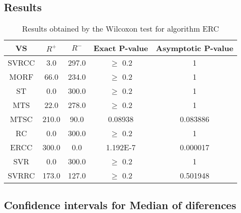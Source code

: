 \documentclass[a4paper,10pt]{article}
\begin{document}
\subsection{Results}

\begin{table}[!htp]
\centering\small
\begin{tabular}{
|c|c|c|c|c|}
\hline
 VS & $R^{+}$ & $R^{-}$ & Exact P-value & Asymptotic P-value \\ \hline 
SVRCC & 3.0 & 297.0 & $\geq$ 0.2 & 1\\ \hline 
MORF & 66.0 & 234.0 & $\geq$ 0.2 & 1\\ \hline 
ST & 0.0 & 300.0 & $\geq$ 0.2 & 1\\ \hline 
MTS & 22.0 & 278.0 & $\geq$ 0.2 & 1\\ \hline 
MTSC & 210.0 & 90.0 & 0.08938 & 0.083886\\ \hline 
RC & 0.0 & 300.0 & $\geq$ 0.2 & 1\\ \hline 
ERCC & 300.0 & 0.0 & 1.192E-7 & 0.000017\\ \hline 
SVR & 0.0 & 300.0 & $\geq$ 0.2 & 1\\ \hline 
SVRRC & 173.0 & 127.0 & $\geq$ 0.2 & 0.501948\\ \hline 

\end{tabular}
\caption{Results obtained by the Wilcoxon test for algorithm ERC}
\end{table}

\subsection{Confidence intervals for Median of diferences}
\end{document}
